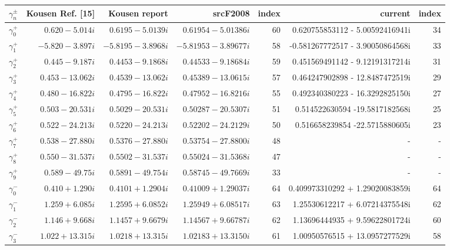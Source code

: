 \documentclass[a4paper]{article}
\begin{document}
\begin{table}
 \centering
 \begin{adjustbox}{width=1\textwidth}
     \small
 \begin{tabular}{c | r | r | r | r | r | r}
 \hline
 $\gamma^{\pm}_n$ & Kousen Ref. [15] & Kousen report & srcF2008 & index  & current & index\\
 \hline
 $\gamma_0^{+}$ & $ 0.620 - 5.014  i $ & $ 0.6195 - 5.0139 i$ & $ 0.61954  - 5.01386 i$ & 60  & 0.620755853112 - 5.00592416941i& 34 \\
 $\gamma_1^{+}$ & $-5.820 - 3.897  i $ & $-5.8195 - 3.8968 i$ & $-5.81953  - 3.89677 i$ & 58  &-0.581267772517 - 3.90050864568i& 33 \\
 $\gamma_2^{+}$ & $ 0.445 - 9.187  i $ & $ 0.4453 - 9.1868 i$ & $ 0.44533  - 9.18684 i$ & 59  &0.451569491142 -  9.12191317214i & 31 \\
 $\gamma_3^{+}$ & $ 0.453 - 13.062 i $ & $ 0.4539 - 13.062 i$ & $ 0.45389  - 13.0615 i$ & 57  &0.464247902898 - 12.8487472519i & 29 \\ 
 $\gamma_4^{+}$ & $ 0.480 - 16.822 i $ & $ 0.4795 - 16.822 i$ & $ 0.47952  - 16.8216 i$ & 55  &0.492340380223 - 16.3292825150i & 27 \\
 $\gamma_5^{+}$ & $ 0.503 - 20.531 i $ & $ 0.5029 - 20.531 i$ & $ 0.50287  - 20.5307 i$ & 51  &0.514522630594 -19.5817182568i& 25 \\
 $\gamma_6^{+}$ & $ 0.522 - 24.213 i $ & $ 0.5220 - 24.213 i$ & $ 0.52202  - 24.2129 i$ & 50  &0.516658239854 -22.5715880605i& 23 \\
 $\gamma_7^{+}$ & $ 0.538 - 27.880 i $ & $ 0.5376 - 27.880 i$ & $ 0.53754  - 27.8800 i$ & 48  & - & - \\
 $\gamma_8^{+}$ & $ 0.550 - 31.537 i $ & $ 0.5502 - 31.537 i$ & $ 0.55024  - 31.5368 i$ & 47  & - & - \\
 $\gamma_9^{+}$ & $ 0.589 - 49.75  i $ & $ 0.5891 - 49.754 i$ & $ 0.58745  - 49.7669 i$ & 33  &- &- \\ \hline
 $\gamma_0^{-}$ & $ 0.410 + 1.290  i $ & $ 0.4101 + 1.2904 i$ & $ 0.41009  + 1.29037 i$ & 64  &0.409973310292  + 1.29020083859i& 64 \\
 $\gamma_1^{-}$ & $ 1.259 + 6.085  i $ & $ 1.2595 + 6.0852 i$ & $ 1.25949  + 6.08517 i$ & 63  &1.25530612217  + 6.07214375548i & 62 \\
 $\gamma_2^{-}$ & $ 1.146 + 9.668  i $ & $ 1.1457 + 9.6679 i$ & $ 1.14567  + 9.66787 i$ & 62  &1.13696444935  + 9.59622801724i &  60\\
$\gamma_3^{-}$ & $ 1.022 + 13.315 i $ & $ 1.0218 + 13.315 i$ & $ 1.02183  + 13.3150 i$ & 61  &1.00950576515 + 13.0957277529i & 58  \\

\end{tabular}
\end{adjustbox}
\end{table}
\end{document}
